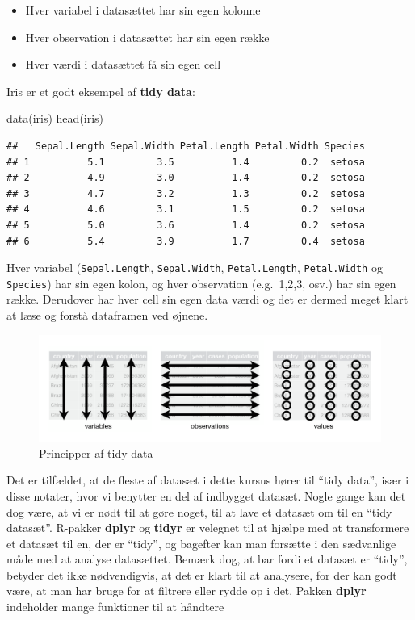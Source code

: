 \documentclass[
]{book}
\newenvironment{Shaded}{\begin{snugshade}}{\end{snugshade}}
\newcommand{\FunctionTok}[1]{\textcolor[rgb]{0.00,0.00,0.00}{#1}}
\newcommand{\NormalTok}[1]{#1}
\providecommand{\tightlist}{%
  \setlength{\itemsep}{0pt}\setlength{\parskip}{0pt}}
\begin{document}
\begin{itemize}
\tightlist
\item
  Hver variabel i datasættet har sin egen kolonne
\item
  Hver observation i datasættet har sin egen række
\item
  Hver værdi i datasættet få sin egen cell
\end{itemize}

Iris er et godt eksempel af \textbf{tidy data}:

\begin{Shaded}
\begin{Highlighting}[]
\FunctionTok{data}\NormalTok{(iris)}
\FunctionTok{head}\NormalTok{(iris)}
\end{Highlighting}
\end{Shaded}

\begin{verbatim}
##   Sepal.Length Sepal.Width Petal.Length Petal.Width Species
## 1          5.1         3.5          1.4         0.2  setosa
## 2          4.9         3.0          1.4         0.2  setosa
## 3          4.7         3.2          1.3         0.2  setosa
## 4          4.6         3.1          1.5         0.2  setosa
## 5          5.0         3.6          1.4         0.2  setosa
## 6          5.4         3.9          1.7         0.4  setosa
\end{verbatim}

Hver variabel (\texttt{Sepal.Length}, \texttt{Sepal.Width}, \texttt{Petal.Length}, \texttt{Petal.Width} og \texttt{Species}) har sin egen kolon, og hver observation (e.g.~1,2,3, osv.) har sin egen række. Derudover har hver cell sin egen data værdi og det er dermed meget klart at læse og forstå dataframen ved øjnene.

\begin{figure}
\centering
\includegraphics[width=1\textwidth,height=\textheight]{plots/tidy-1.png}
\caption{Principper af tidy data}
\end{figure}

Det er tilfældet, at de fleste af datasæt i dette kursus hører til ``tidy data'', især i disse notater, hvor vi benytter en del af indbygget datasæt. Nogle gange kan det dog være, at vi er nødt til at gøre noget, til at lave et datasæt om til en ``tidy datasæt''. R-pakker \textbf{dplyr} og \textbf{tidyr} er velegnet til at hjælpe med at transformere et datasæt til en, der er ``tidy'', og bagefter kan man forsætte i den sædvanlige måde med at analyse datasættet. Bemærk dog, at bar fordi et datasæt er ``tidy'', betyder det ikke nødvendigvis, at det er klart til at analysere, for der kan godt være, at man har bruge for at filtrere eller rydde op i det. Pakken \textbf{dplyr} indeholder mange funktioner til at håndtere
\end{document}

